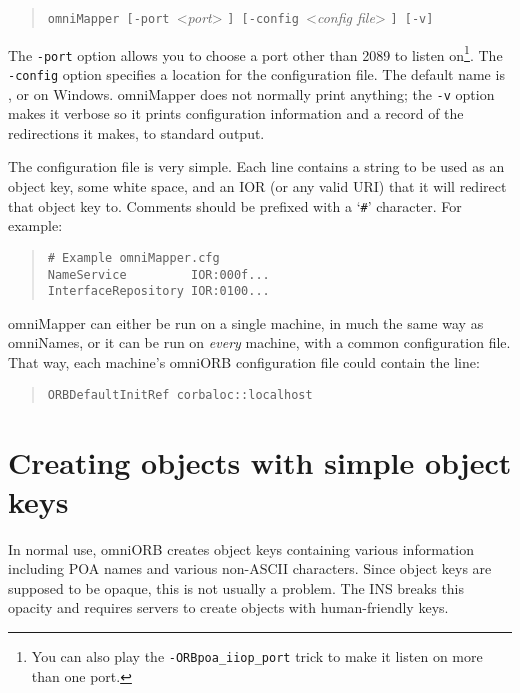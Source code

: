 \documentclass[11pt,twoside,a4paper]{book}
\newcommand{\cmdline}[1]{\texttt{#1}}
\newcommand{\file}{\begingroup \urlstyle{tt}\Url}
\begin{document}
\begin{quote}
\cmdline{omniMapper [-port }<\textit{port}>%
\cmdline{] [-config }<\textit{config file}>%
\cmdline{] [-v]}
\end{quote}

\noindent The \cmdline{-port} option allows you to choose a port other
than 2089 to listen on\footnote{You can also play the
\cmdline{-ORBpoa\_iiop\_port} trick to make it listen on more than one
port.}. The \cmdline{-config} option specifies a location for the
configuration file. The default name is \file{/etc/omniMapper.cfg}, or
\file{C:\omniMapper.cfg}
on Windows. omniMapper does not normally print anything; the
\cmdline{-v} option makes it verbose so it prints configuration
information and a record of the redirections it makes, to standard
output.

The configuration file is very simple. Each line contains a string to
be used as an object key, some white space, and an IOR (or any valid
URI) that it will redirect that object key to. Comments should be
prefixed with a `\texttt{\#}' character. For example:

\begin{quote}
\begin{verbatim}
# Example omniMapper.cfg
NameService         IOR:000f...
InterfaceRepository IOR:0100...
\end{verbatim}
\end{quote}

omniMapper can either be run on a single machine, in much the same way
as omniNames, or it can be run on \emph{every} machine, with a common
configuration file. That way, each machine's omniORB configuration
file could contain the line:

\begin{quote}
\begin{verbatim}
ORBDefaultInitRef corbaloc::localhost
\end{verbatim}
\end{quote}



\section{Creating objects with simple object keys}

In normal use, omniORB creates object keys containing various
information including POA names and various non-ASCII characters.
Since object keys are supposed to be opaque, this is not usually a
problem. The INS breaks this opacity and requires servers to create
objects with human-friendly keys.
\end{document}
